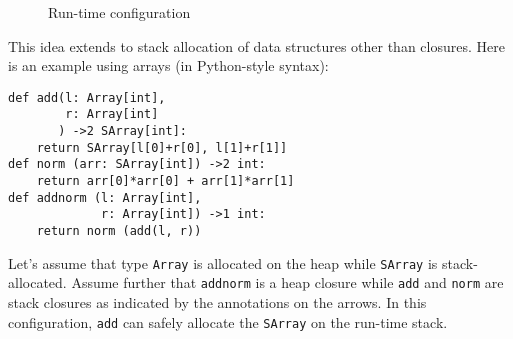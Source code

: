 \documentclass[sigplan,dvipsnames,screen]{acmart}
\begin{document}
\begin{figure}[tp]
\caption{Run-time configuration}
  \label{fig:runtime-configuration}
\end{figure}
This idea extends to stack allocation of data structures
other than closures. Here is an example using arrays (in Python-style syntax):
\begin{lstlisting}
def add(l: Array[int],
        r: Array[int]
       ) ->2 SArray[int]:
    return SArray[l[0]+r[0], l[1]+r[1]]
def norm (arr: SArray[int]) ->2 int:
    return arr[0]*arr[0] + arr[1]*arr[1]
def addnorm (l: Array[int],
             r: Array[int]) ->1 int:
    return norm (add(l, r))
\end{lstlisting}
Let's assume that type \texttt{Array} is
allocated on the heap while \texttt{SArray} is stack-allocated.
Assume further that \texttt{addnorm} is a heap closure while \texttt{add}
and \texttt{norm} are stack closures as indicated by the annotations
on the arrows.
In this configuration, \texttt{add} can safely allocate the
\texttt{SArray} on the run-time stack.
\end{document}
